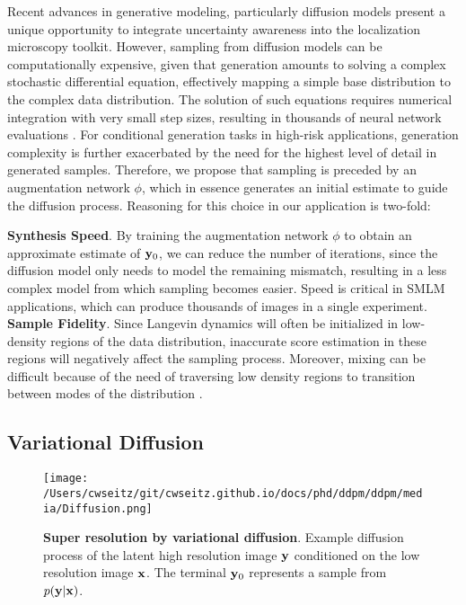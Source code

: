 Recent advances in generative modeling, particularly diffusion models \parencite{Ho2020,Song2021} present a unique opportunity to integrate uncertainty awareness into the localization microscopy toolkit. However, sampling from diffusion models can be computationally expensive, given that generation amounts to solving a complex stochastic differential equation, effectively mapping a simple base distribution to the complex data distribution. The solution of such equations requires numerical integration with very small step sizes, resulting in thousands of neural network evaluations \parencite{Saharia2021,Vahdat2021}. For conditional generation tasks in high-risk applications, generation complexity is further exacerbated by the need for the highest level of detail in generated samples. Therefore, we propose that sampling is preceded by an augmentation network $\phi$, which in essence generates an initial estimate to guide the diffusion process. Reasoning for this choice in our application is two-fold:

\textbf{Synthesis Speed}. By training the augmentation network $\phi$ to obtain an approximate estimate of $\bold{y}_{0}$, we can reduce the number of iterations, since the diffusion model only needs to model the remaining mismatch, resulting in a less complex model from which sampling becomes easier. Speed is critical in SMLM applications, which can produce thousands of images in a single experiment.\\

\textbf{Sample Fidelity}. Since Langevin dynamics will often be initialized in low-density regions of the data distribution, inaccurate score estimation in these regions will negatively affect the sampling process. Moreover, mixing can be difficult because of the need of traversing low density regions to transition between modes of the distribution \parencite{Song2019}.

\subsection{Variational Diffusion}


\begin{figure}[t]
\texttt{[image: /Users/cwseitz/git/cwseitz.github.io/docs/phd/ddpm/ddpm/media/Diffusion.png]}
\caption{\textbf{Super resolution by variational diffusion}. Example diffusion process of the latent high resolution image $\bold{y}$ conditioned on the low resolution image $\bold{x}$. The terminal $\bold{y}_{0}$ represents a sample from $p(\bold{y}\lvert\bold{x})$.}
\end{figure}

